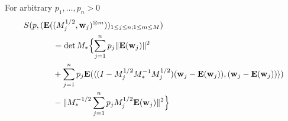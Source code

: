 \begin{lemma}\label{formulaforS}
For arbitrary $p_1,\hdots,p_n>0$
\begin{equation}\label{equationforS}
\begin{split}
S(p, ({\hbox{\bf E}}(& (M_j^{1/2}, {\hbox{\bf w}}_j)^{\otimes m} ))_{1 \leq j \leq n; 1
\leq m \leq M} )\\&=
\det M_* \Bigl\{\sum_{j=1}^n p_{j}\|{\hbox{\bf E}}({\hbox{\bf w}}_j)\|^2\\
&+ \sum_{j=1}^n p_{j}{\hbox{\bf E}} (\langle(I-M_j^{1/2}M_*^{-1}M_j^{1/2})({\hbox{\bf w}}_j-{\hbox{\bf E}}({\hbox{\bf w}}_j)),
({\hbox{\bf w}}_j-{\hbox{\bf E}}({\hbox{\bf w}}_j))\rangle) \\
&-\| M_*^{-1/2}\sum_{j=1}^n p_{j}M_j^{1/2} {\hbox{\bf E}}({\hbox{\bf w}}_j) \|^2\Bigr\}\\
\end{split}
\end{equation}
\end{lemma}

